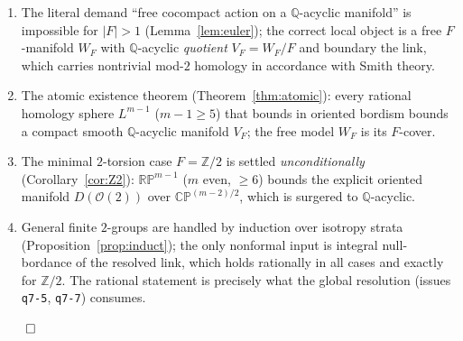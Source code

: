 \documentclass[12pt]{article}
\theoremstyle{definition}
\begin{document}
\begin{enumerate}
\item The literal demand ``free cocompact action on a $\mathbb{Q}$-acyclic
manifold'' is impossible for $|F|>1$ (Lemma~\ref{lem:euler}); the correct local
object is a free $F$-manifold $W_F$ with $\mathbb{Q}$-acyclic \emph{quotient}
$V_F=W_F/F$ and boundary the link, which carries nontrivial mod-$2$ homology in
accordance with Smith theory.
\item The atomic existence theorem (Theorem~\ref{thm:atomic}): every rational
homology sphere $L^{m-1}$ ($m-1\ge5$) that bounds in oriented bordism bounds a
compact smooth $\mathbb{Q}$-acyclic manifold $V_F$; the free model $W_F$ is its
$F$-cover.
\item The minimal $2$-torsion case $F=\mathbb{Z}/2$ is settled
\emph{unconditionally} (Corollary~\ref{cor:Z2}): $\mathbb{RP}^{m-1}$
($m$ even, $\ge6$) bounds the explicit oriented manifold $D(\mathcal{O}(2))$
over $\mathbb{CP}^{(m-2)/2}$, which is surgered to $\mathbb{Q}$-acyclic.
\item General finite $2$-groups are handled by induction over isotropy strata
(Proposition~\ref{prop:induct}); the only nonformal input is integral
null-bordance of the resolved link, which holds rationally in all cases and
exactly for $\mathbb{Z}/2$. The rational statement is precisely what the global
resolution (issues \texttt{q7-5}, \texttt{q7-7}) consumes.
\end{enumerate}
\hfill$\qed$
\end{document}
